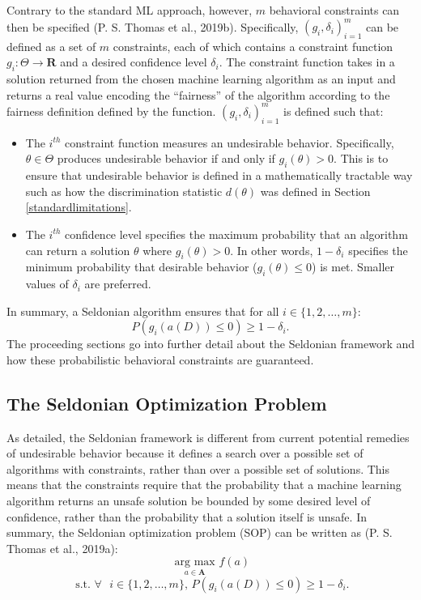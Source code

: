 \documentclass[12pt, twoside]{amherstthesis}
\begin{document}
Contrary to the standard ML approach, however, \(m\) behavioral constraints can then be specified (P. S. Thomas et al., 2019b). Specifically, \((g_i, \delta_i)_{i=1}^{m}\) can be defined as a set of \(m\) constraints, each of which contains a constraint function \(g_i: \Theta \rightarrow \textbf{R}\) and a desired confidence level \(\delta_i\). The constraint function takes in a solution returned from the chosen machine learning algorithm as an input and returns a real value encoding the ``fairness'' of the algorithm according to the fairness definition defined by the function. \((g_i, \delta_i)_{i=1}^{m}\) is defined such that:
\begin{itemize}
\item
  The \(i^{th}\) constraint function measures an undesirable behavior. Specifically, \(\theta \in \Theta\) produces undesirable behavior if and only if \(g_i(\theta) > 0\). This is to ensure that undesirable behavior is defined in a mathematically tractable way such as how the discrimination statistic \(d(\theta)\) was defined in Section \ref{standardlimitations}.
\item
  The \(i^{th}\) confidence level specifies the maximum probability that an algorithm can return a solution \(\theta\) where \(g_i(\theta) > 0\). In other words, \(1 - \delta_i\) specifies the minimum probability that desirable behavior (\(g_i(\theta) \leq 0\)) is met. Smaller values of \(\delta_i\) are preferred.
\end{itemize}
In summary, a Seldonian algorithm ensures that for all \(i \in \{1,2,\ldots,m\}\):
\begin{equation}
\label{ch2eq6}
P(g_i(a(D)) \leq 0) \geq 1 - \delta_i.
\end{equation}
The proceeding sections go into further detail about the Seldonian framework and how these probabilistic behavioral constraints are guaranteed.

\hypertarget{sop}{%
\subsection{The Seldonian Optimization Problem}\label{sop}}

As detailed, the Seldonian framework is different from current potential remedies of undesirable behavior because it defines a search over a possible set of algorithms with constraints, rather than over a possible set of solutions. This means that the constraints require that the probability that a machine learning algorithm returns an unsafe solution be bounded by some desired level of confidence, rather than the probability that a solution itself is unsafe. In summary, the Seldonian optimization problem (SOP) can be written as (P. S. Thomas et al., 2019a):
\begin{equation}
\label{ch2eq7}
\underset{a \in \textbf{A}}{\text{ arg max }} f(a)
\end{equation}
\[\text{ s.t. } \forall \text{ } i \in \{1, 2, \ldots, m\} \text{, } P(g_i(a(D)) \leq 0) \geq 1 - \delta_i.\]
\end{document}
